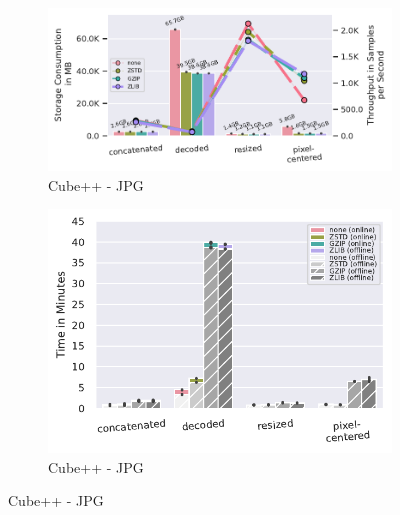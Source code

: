\documentclass[sigconf,nonacm]{acmart}
\begin{document}
\begin{figure}[b]
  \begin{subfigure}{0.49 \columnwidth}
    \includegraphics[width=\linewidth]{../images/cubeplusplus-jpg-pipeline/compressed-storage-vs-throughput.pdf}
    \caption{Cube++ - JPG}
    \Description{}
    \label{fig:zstd-cpp-jpg-compressed-storage-vs-throughput}
  \end{subfigure}
  \hfill %
  \begin{subfigure}{0.49 \columnwidth}
    \includegraphics[width=\linewidth]{../images/cubeplusplus-jpg-pipeline/compression-processing-time-split.pdf}
    \caption{Cube++ - JPG}
    \Description{}
    \label{fig:zstd-cpp-jpg-compression-processing-time-split}
  \end{subfigure}
  

\end{figure}
\end{document}
